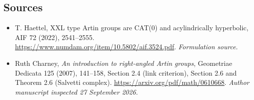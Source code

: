 \documentclass[11pt]{article}
\begin{document}
\subsection{Sources}
\begin{itemize}
\item[S1]T. Haettel, XXL type Artin groups are CAT(0) and acylindrically hyperbolic, AIF 72 (2022), 2541–2555.
\url{https://www.numdam.org/item/10.5802/aif.3524.pdf}.
\textit{Formulation source.}
\item[E1]Ruth Charney, \emph{An introduction to right-angled Artin groups},
Geometriae Dedicata 125 (2007), 141--158, Section 2.4 (link criterion),
Section 2.6 and Theorem 2.6 (Salvetti complex).
\url{https://arxiv.org/pdf/math/0610668}.
\textit{Author manuscript inspected 27 September 2026.}
\end{itemize}
\end{document}
